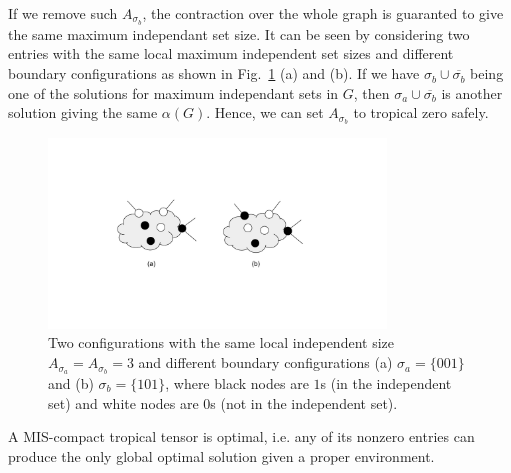 \documentclass[review,onefignum,onetabnum]{siamart190516}
\newcommand{\<}{\langle}
\renewcommand{\>}{\rangle}
\newcommand{\Fig}[1]{Fig.~\ref{#1}}
\begin{document}
If we remove such $A_{\sigma_b}$, the contraction over the whole graph is guaranted to give the same maximum independant set size.
It can be seen by considering two entries with the same local maximum independent set sizes and different boundary configurations as shown in \Fig{fig:compactifying} (a) and (b).
If we have $\sigma_b \cup \overline{\sigma_b}$ being one of the solutions for maximum independant sets in $G$, then $\sigma_a \cup \overline{\sigma_b}$ is another solution giving the same $\alpha(G)$.
Hence, we can set $A_{\sigma_b}$ to tropical zero safely.

\begin{figure}
    \centering
    \includegraphics[width=0.8\textwidth, trim={5cm 4cm 5cm 4cm}, clip]{compressionrule.pdf}
    \caption{Two configurations with the same local independent size $A_{\sigma_a} = A_{\sigma_b} = 3$ and different boundary configurations (a) $\sigma_a=\{001\}$ and (b) $\sigma_b = \{101\}$, where black nodes are $1$s (in the independent set) and white nodes are $0$s (not in the independent set).}\label{fig:compactifying}
\end{figure}

\begin{theorem}
    A MIS-compact tropical tensor is optimal, i.e. any of its nonzero entries can produce the only global optimal solution given a proper environment.
\end{theorem}
\end{document}

